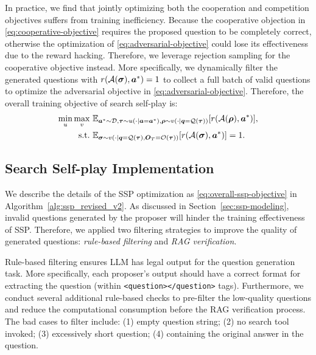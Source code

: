\documentclass[10pt, a4paper, logo]{googledeepmind} %
\begin{document}
In practice, we find that jointly optimizing both the cooperation and competition objectives suffers from training inefficiency. Because the cooperative objection in \eqref{eq:cooperative-objective} requires the proposed question to be completely correct, otherwise the optimization of \eqref{eq:adversarial-objective} could lose its effectiveness due to the reward hacking. Therefore, we leverage rejection sampling \citep{liu2025augmenting} for the cooperative objective instead. More specifically, we dynamically filter the generated questions with $r({\mathcal{A}}({\bm{\sigma}}), {\bm{a}}^*) = 1$ to collect a full batch of valid questions to optimize the adversarial objective in \eqref{eq:adversarial-objective}. Therefore, the overall training objective of search self-play is:
\begin{align}
    \min_{u } \max_{v} \ &  {\mathbb{E}}_{{\bm{a}}^* \sim {\mathcal{D}}, {\bm{\tau}} \sim u(\cdot| {\bm{a}} = {\bm{a}}^*), {\bm{\rho}} \sim v(\cdot| {\bm{q}} = {\mathcal{Q}}({\bm{\tau}}) ) }[r({\mathcal{A}}({\bm{\rho}}), {\bm{a}}^*)], \label{eq:overall-ssp-objective} \\
 \text{s.t.} \ & {\mathbb{E}}_{{\bm{\sigma}} \sim v(\cdot | {\bm{q}} = {\mathcal{Q}}({\bm{\tau}}), {\bm{O}}_T = {\mathcal{O}}({\bm{\tau}}))} [r({\mathcal{A}}({\bm{\sigma}}), {\bm{a}}^*)] = 1. \nonumber
\end{align}


\vspace{-1mm}
\subsection{Search Self-play Implementation}
\vspace{-1mm}


We describe the details of the SSP optimization as \eqref{eq:overall-ssp-objective} in Algorithm~\ref{alg:ssp_revised_v2}. As discussed in Section~\ref{sec:ssp-modeling}, invalid questions generated by the proposer will hinder the training effectiveness of SSP. Therefore, we applied two filtering strategies to improve the quality of generated questions: \textit{rule-based filtering} and \textit{RAG verification}. 

Rule-based filtering ensures LLM has legal output for the question generation task. More specifically, each proposer's output should have a correct format for extracting the question (within \texttt{<question></question>} tags). Furthermore, we conduct several additional rule-based checks to pre-filter the low-quality questions and reduce the computational consumption before the RAG verification process. The bad cases to filter include: (1) empty question string; (2) no search tool invoked; (3)  excessively short question; (4) containing the original answer in the question.  
\end{document}
